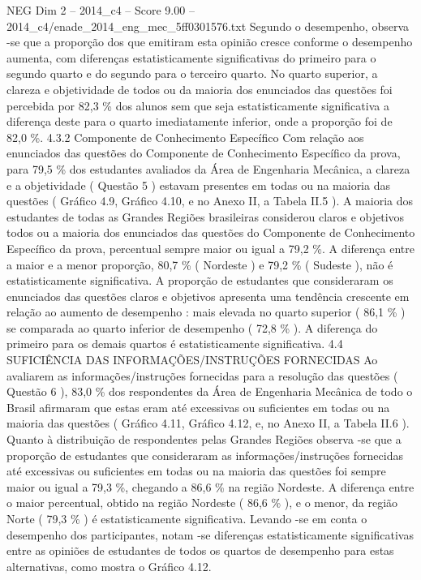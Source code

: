 \begin{textsample}{NEG Dim 2 – 2014\_c4 – Score 9.00 – 2014\_c4/enade\_2014\_eng\_mec\_5ff0301576.txt}
Segundo o desempenho, observa -se que a proporção dos que emitiram esta opinião cresce conforme o desempenho aumenta, com diferenças estatisticamente significativas do primeiro para o segundo quarto e do segundo para o terceiro quarto.
No quarto superior, a clareza e objetividade de todos ou da maioria dos enunciados das questões foi percebida por 82,3 \% dos alunos sem que seja estatisticamente significativa a diferença deste para o quarto imediatamente inferior, onde a proporção foi de 82,0 \%. 4.3.2 Componente de Conhecimento Específico Com relação aos enunciados das questões do Componente de Conhecimento Específico da prova, para 79,5 \% dos estudantes avaliados da Área de Engenharia Mecânica, a clareza e a objetividade ( Questão 5 ) estavam presentes em todas ou na maioria das questões ( Gráfico 4.9, Gráfico 4.10, e no Anexo II, a Tabela II.5 ).
A maioria dos estudantes de todas as Grandes Regiões brasileiras considerou claros e objetivos todos ou a maioria dos enunciados das questões do Componente de Conhecimento Específico da prova, percentual sempre maior ou igual a 79,2 \%.
A diferença entre a maior e a menor proporção, 80,7 \% ( Nordeste ) e 79,2 \% ( Sudeste ), não é estatisticamente significativa.
A proporção de estudantes que consideraram os enunciados das questões claros e objetivos apresenta uma tendência crescente em relação ao aumento de desempenho : mais elevada no quarto superior ( 86,1 \% ) se comparada ao quarto inferior de desempenho ( 72,8 \% ).
A diferença do primeiro para os demais quartos é estatisticamente significativa. 4.4 SUFICIÊNCIA DAS INFORMAÇÕES/INSTRUÇÕES FORNECIDAS Ao avaliarem as informações/instruções fornecidas para a resolução das questões ( Questão 6 ), 83,0 \% dos respondentes da Área de Engenharia Mecânica de todo o Brasil afirmaram que estas eram até excessivas ou suficientes em todas ou na maioria das questões ( Gráfico 4.11, Gráfico 4.12, e, no Anexo II, a Tabela II.6 ).
Quanto à distribuição de respondentes pelas Grandes Regiões observa -se que a proporção de estudantes que consideraram as informações/instruções fornecidas até excessivas ou suficientes em todas ou na maioria das questões foi sempre maior ou igual a 79,3 \%, chegando a 86,6 \% na região Nordeste.
A diferença entre o maior percentual, obtido na região Nordeste ( 86,6 \% ), e o menor, da região Norte ( 79,3 \% ) é estatisticamente significativa.
Levando -se em conta o desempenho dos participantes, notam -se diferenças estatisticamente significativas entre as opiniões de estudantes de todos os quartos de desempenho para estas alternativas, como mostra o Gráfico 4.12.

\end{textsample}
